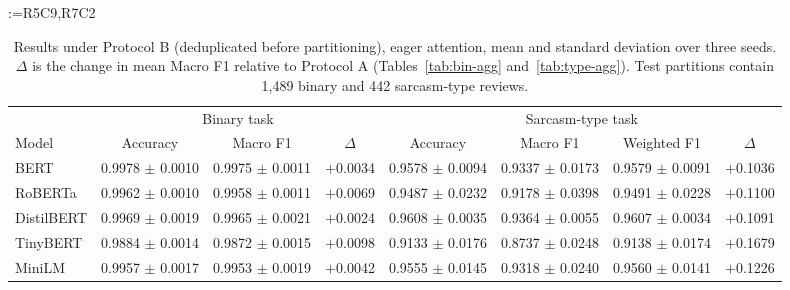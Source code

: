 \documentclass[a4paper,fleqn]{cas-sc}
\makeatletter
\newif\iftracked
\newcommand{\rv@setcolour}[1]{%
  \IfStrEq{#1}{R7C7}{\color{rvEdit}}{%
    \IfSubStr{#1}{R5}{\IfSubStr{#1}{R7}{\color{rvBoth}}{\color{rvFive}}}{\color{rvSeven}}}}
\newcommand{\rv@tag}[1]{\textsuperscript{\sffamily\bfseries\scriptsize[\StrSubstitute{#1}{,}{, }]}\,}
\newcommand{\rv@recordone}[1]{%
  \edef\rv@i{#1}%
  \ifcsdef{rv@n@\rv@i}{}{\csgdef{rv@n@\rv@i}{0}}%
  \csxdef{rv@n@\rv@i}{\the\numexpr\csuse{rv@n@\rv@i}+1\relax}%
  \begingroup\edef\@currentlabel{\rv@i}\label{rv:\rv@i:\csuse{rv@n@\rv@i}}\endgroup}
\newcommand{\rv@record}[1]{\@for\rv@id:=#1\do{\expandafter\rv@recordone\expandafter{\rv@id}}}
\DeclareRobustCommand{\rcx}[2]{\iftracked{\rv@setcolour{#1}\rv@tag{#1}#2}\else#2\fi}
\DeclareRobustCommand{\rcmark}[1]{\rv@record{#1}}
\makeatother
\begin{document}
\begin{table}[t]
\caption{\rcx{R5C9,R7C2}{Results under Protocol B (deduplicated before partitioning), eager attention, mean and standard deviation over three seeds. $\Delta$ is the change in mean Macro F1 relative to Protocol A (Tables~\ref{tab:bin-agg} and~\ref{tab:type-agg}). Test partitions contain 1,489 binary and 442 sarcasm-type reviews.}}
\rcmark{R5C9,R7C2}
\label{tab:dedup-results}
\centering\small
\iftracked\color{rvBoth}\fi
\begin{adjustbox}{max width=\textwidth}
\begin{tabular}{lccccccc}
\toprule
 & \multicolumn{3}{c}{Binary task} & \multicolumn{4}{c}{Sarcasm-type task} \\
\cmidrule(lr){2-4}\cmidrule(lr){5-8}
Model & Accuracy & Macro F1 & $\Delta$ & Accuracy & Macro F1 & Weighted F1 & $\Delta$ \\
\midrule
BERT & 0.9978 $\pm$ 0.0010 & 0.9975 $\pm$ 0.0011 & $+$0.0034 & 0.9578 $\pm$ 0.0094 & 0.9337 $\pm$ 0.0173 & 0.9579 $\pm$ 0.0091 & $+$0.1036 \\
RoBERTa & 0.9962 $\pm$ 0.0010 & 0.9958 $\pm$ 0.0011 & $+$0.0069 & 0.9487 $\pm$ 0.0232 & 0.9178 $\pm$ 0.0398 & 0.9491 $\pm$ 0.0228 & $+$0.1100 \\
DistilBERT & 0.9969 $\pm$ 0.0019 & 0.9965 $\pm$ 0.0021 & $+$0.0024 & 0.9608 $\pm$ 0.0035 & 0.9364 $\pm$ 0.0055 & 0.9607 $\pm$ 0.0034 & $+$0.1091 \\
TinyBERT & 0.9884 $\pm$ 0.0014 & 0.9872 $\pm$ 0.0015 & $+$0.0098 & 0.9133 $\pm$ 0.0176 & 0.8737 $\pm$ 0.0248 & 0.9138 $\pm$ 0.0174 & $+$0.1679 \\
MiniLM & 0.9957 $\pm$ 0.0017 & 0.9953 $\pm$ 0.0019 & $+$0.0042 & 0.9555 $\pm$ 0.0145 & 0.9318 $\pm$ 0.0240 & 0.9560 $\pm$ 0.0141 & $+$0.1226 \\
\bottomrule
\end{tabular}
\end{adjustbox}
\end{table}
\end{document}
